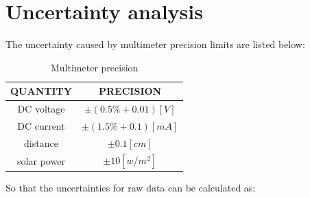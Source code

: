 \documentclass[12pt, a4paper]{article}
\begin{document}
\section{Uncertainty analysis}
The uncertainty caused by multimeter precision limits are listed below:
\begin{table}[H]
	\begin{center}
		\begin{tabular}{|c|c|}
			\hline
			QUANTITY    & PRECISION              \\ \hline
			DC voltage  & $\pm (0.5\%+0.01) [V]$ \\ \hline
			DC current  & $\pm (1.5\%+0.1) [mA]$ \\ \hline
			distance    & $\pm 0.1 [cm]$         \\ \hline
			solar power & $\pm 10 [w/m^2]$       \\ \hline
			\end{tabular}
			\caption{Multimeter precision}
	\end{center}
\end{table}

So that the uncertainties for raw data can be calculated as:
\end{document}
